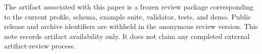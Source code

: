 The artifact associated with this paper is a frozen review package corresponding to the current profile, schema, example suite, validator, tests, and demo. Public release and archive identifiers are withheld in the anonymous review version. This note records artifact availability only. It does not claim any completed external artifact-review process.
